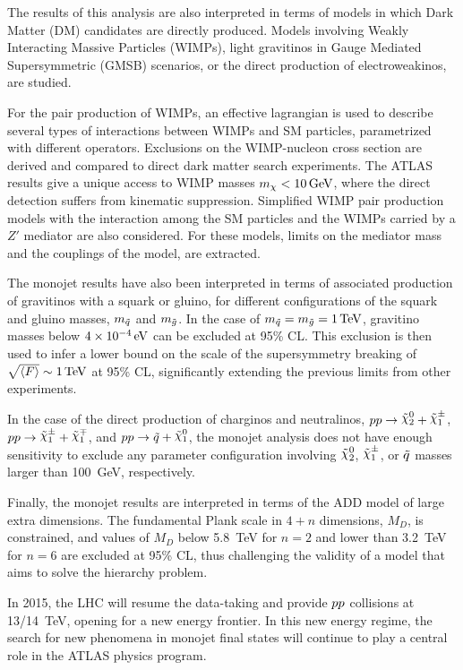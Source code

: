 The results of this analysis are also interpreted in terms of models in which Dark Matter (DM) candidates are directly produced.
Models involving Weakly Interacting Massive Particles (WIMPs), light gravitinos in Gauge Mediated Supersymmetric (GMSB) scenarios, or the direct production of electroweakinos, are studied.

For the pair production of WIMPs, an effective lagrangian is used to describe several types of interactions between WIMPs and SM particles, parametrized with different operators.
Exclusions on the WIMP-nucleon cross section are derived and compared to direct dark matter search experiments.
The ATLAS results give a unique access to WIMP masses $m_{\chi}<\unit[10]{GeV}$, where the direct detection suffers from kinematic suppression.
Simplified WIMP pair production models with the interaction among the SM particles and the WIMPs carried by a $Z'$ mediator are also considered.
For these models, limits on the mediator mass and the couplings of the model, are extracted.

The monojet results have also been interpreted in terms of associated production of gravitinos with a squark or gluino, for different configurations of the squark and gluino masses, $m_{\tilde{q}}$ and $m_{\tilde{g}}$.
In the case of $m_{\squark} = m_{\gluino} = \unit[1]{TeV}$, gravitino masses below $\unit[4\times10^{-4}]{eV}$ can be excluded at 95\% CL.
This exclusion is then used to infer a lower bound on the scale of the supersymmetry breaking of $\sqrt{\langle F \rangle} \sim \unit[1]{TeV}$ at 95\% CL, significantly extending the previous limits from other experiments.

In the case of the direct production of charginos and neutralinos, $\charginoneutralino$, $\charginochargino$, and $\squarkneutralino$, the monojet analysis does not have enough sensitivity to exclude any parameter configuration involving $\ninotwo$, $\chinoonepm$, or $\tilde{q}$ masses larger than 100~GeV, respectively.

Finally, the monojet results are interpreted in terms of the ADD model of large extra dimensions.
The fundamental Plank scale in $4+n$ dimensions, $M_D$, is constrained, and values of $M_D$ below 5.8~TeV for $n=2$ and lower than 3.2~TeV for $n=6$ are excluded at 95\% CL, thus challenging the validity of a model that aims to solve the hierarchy problem.

In 2015, the LHC will resume the data-taking and provide $pp$ collisions at 13/14~TeV, opening for a new energy frontier. 
In this new energy regime, the search for new phenomena in monojet final states will continue to play a central role in the ATLAS physics program.
